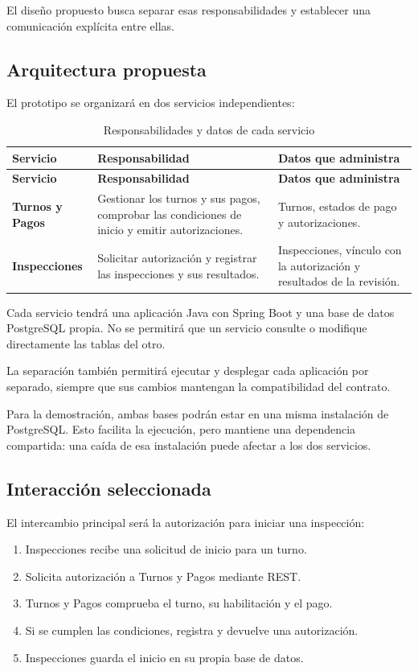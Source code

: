 \documentclass[11pt,a4paper]{article}
\begin{document}
El diseño propuesto busca separar esas responsabilidades y establecer una comunicación explícita entre ellas.

\subsection{Arquitectura propuesta}

El prototipo se organizará en dos servicios independientes:

\begin{xltabular}{\textwidth}{L{3.2cm}XX}
  \caption{Responsabilidades y datos de cada servicio}\label{tab:servicios}\\
  \toprule
  \textbf{Servicio} & \textbf{Responsabilidad} & \textbf{Datos que administra} \\
  \midrule
  \endfirsthead
  \toprule
  \textbf{Servicio} & \textbf{Responsabilidad} & \textbf{Datos que administra} \\
  \midrule
  \endhead
  \bottomrule
  \endfoot
  \textbf{Turnos y Pagos} & Gestionar los turnos y sus pagos, comprobar las condiciones de inicio y emitir autorizaciones. & Turnos, estados de pago y autorizaciones. \\
  \textbf{Inspecciones} & Solicitar autorización y registrar las inspecciones y sus resultados. & Inspecciones, vínculo con la autorización y resultados de la revisión. \\
\end{xltabular}

Cada servicio tendrá una aplicación Java con Spring Boot y una base de datos PostgreSQL propia. No se permitirá que un servicio consulte o modifique directamente las tablas del otro.

La separación también permitirá ejecutar y desplegar cada aplicación por separado, siempre que sus cambios mantengan la compatibilidad del contrato.

Para la demostración, ambas bases podrán estar en una misma instalación de PostgreSQL. Esto facilita la ejecución, pero mantiene una dependencia compartida: una caída de esa instalación puede afectar a los dos servicios.

\subsection{Interacción seleccionada}

El intercambio principal será la autorización para iniciar una inspección:

\begin{enumerate}[nosep]
  \item Inspecciones recibe una solicitud de inicio para un turno.
  \item Solicita autorización a Turnos y Pagos mediante REST.
  \item Turnos y Pagos comprueba el turno, su habilitación y el pago.
  \item Si se cumplen las condiciones, registra y devuelve una autorización.
  \item Inspecciones guarda el inicio en su propia base de datos.
\end{enumerate}
\end{document}
